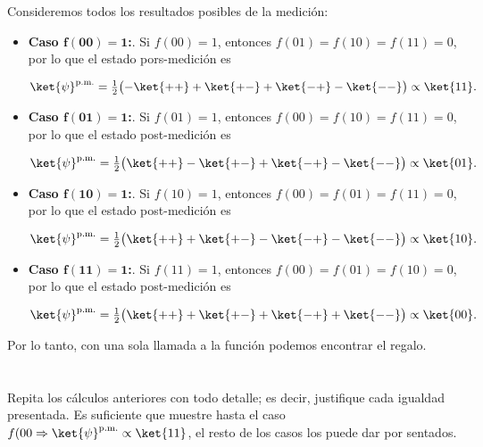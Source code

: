 \documentclass[./../main.tex]{subfiles}
\begin{document}
Consideremos todos los resultados posibles de la medición:

\begin{itemize}
	\item \textbf{Caso \(\bm{f(00) = 1}\):}. Si \(f(00) = 1\), entonces \(f(01) = f(10) = f(11) = 0\), por lo que el estado pors-medición es

	      \begin{equation*}
		      \ket{\psi}^{\text{p.m.}} = \tfrac{1}{2}\bigl(-\ket{++} + \ket{+-} + \ket{-+} - \ket{--}\bigr) \propto \ket{11}.
	      \end{equation*}


	\item \textbf{Caso \(\bm{f(01) = 1}\):}. Si \(f(01) = 1\), entonces \(f(00) = f(10) = f(11) = 0\), por lo que el estado post-medición es

	      \begin{equation*}
		      \ket{\psi}^{\text{p.m.}} = \tfrac{1}{2}\bigl(\ket{++} - \ket{+-} + \ket{-+} - \ket{--}\bigr) \propto \ket{01}.
	      \end{equation*}

	\item \textbf{Caso \(\bm{f(10) = 1}\):}. Si \(f(10) = 1\), entonces \(f(00) = f(01) = f(11) = 0\), por lo que el estado post-medición es

	      \begin{equation*}
		      \ket{\psi}^{\text{p.m.}} = \tfrac{1}{2}\bigl(\ket{++} + \ket{+-} - \ket{-+} - \ket{--}\bigr) \propto \ket{10}.
	      \end{equation*}

	\item \textbf{Caso \(\bm{f(11) = 1}\):}. Si \(f(11) = 1\), entonces \(f(00) = f(01) = f(10) = 0\), por lo que el estado post-medición es

	      \begin{equation*}
		      \ket{\psi}^{\text{p.m.}} = \tfrac{1}{2}\bigl(\ket{++} + \ket{+-} + \ket{-+} + \ket{--}\bigr) \propto \ket{00}.
	      \end{equation*}
\end{itemize}

Por lo tanto, con una sola llamada a la función podemos encontrar el regalo.
\section{}

Repita los cálculos anteriores con todo detalle; es decir, justifique cada igualdad presentada. Es suficiente que muestre hasta el caso \(f(00  \Rightarrow \ket{\psi}^{\text{p.m.}} \propto \ket{11}\), el resto de los casos los puede dar por sentados.
\end{document}
